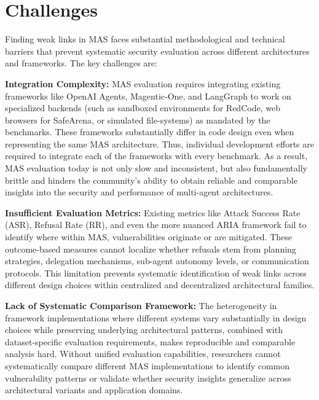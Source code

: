 \vspace{-10pt}
\section{Challenges}

Finding weak links in MAS faces substantial methodological and technical barriers that prevent systematic security evaluation across different architectures and frameworks.
The key challenges are:


\textbf{Integration Complexity:} MAS evaluation requires integrating existing frameworks like OpenAI Agents, Magentic-One, and LangGraph to work on specialized backends (such as sandboxed environments for RedCode, web browsers for SafeArena, or simulated file-systems) as mandated by the benchmarks. These frameworks substantially differ in code design even when representing the same MAS architecture. Thus, individual development efforts are required to integrate each of the frameworks with every benchmark. As a result, MAS evaluation today is not only slow and inconsistent, but also fundamentally brittle and hinders the community’s ability to obtain reliable and comparable insights into the security and performance of multi-agent architectures.

\textbf{Insufficient Evaluation Metrics:} Existing metrics like Attack Success Rate (ASR), Refusal Rate (RR), and even the more nuanced ARIA framework fail to identify where within MAS, vulnerabilities originate or are mitigated. These outcome-based measures cannot localize whether refusals stem from planning strategies, delegation mechanisms, sub-agent autonomy levels, or communication protocols. This limitation prevents systematic identification of weak links across different design choices within centralized and decentralized architectural families.

\textbf{Lack of Systematic Comparison Framework:} The heterogeneity in framework implementations where different systems vary substantially in design choices while preserving underlying architectural patterns, combined with dataset-specific evaluation requirements, makes reproducible and comparable analysis hard. Without unified evaluation capabilities, researchers cannot systematically compare different MAS implementations to identify common vulnerability patterns or validate whether security insights generalize across architectural variants and application domains.